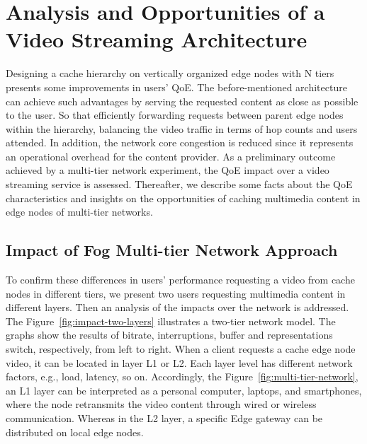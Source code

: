 \section{Analysis and Opportunities of a Video Streaming Architecture}
\label{sec:system-archi}


Designing a cache hierarchy on vertically organized edge nodes with N tiers presents some improvements in users’ QoE. The before-mentioned architecture can achieve such advantages by serving the requested content as close as possible to the user. So that efficiently forwarding requests between parent edge nodes within the hierarchy, balancing the video traffic in terms of hop counts and users attended. In addition, the network core congestion is reduced since it represents an operational overhead for the content provider.
As a preliminary outcome achieved by a multi-tier network experiment, the QoE impact over a video streaming service is assessed. Thereafter, we describe some facts about the QoE characteristics and insights on the opportunities of caching multimedia content in edge nodes of multi-tier networks.

\subsection{Impact of Fog Multi-tier Network Approach}

To confirm these differences in users' performance requesting a video from cache nodes in different tiers, we present two users requesting multimedia content in different layers. Then an analysis of the impacts over the network is addressed. The Figure~\ref{fig:impact-two-layers} illustrates a two-tier network model. The graphs show the results of bitrate, interruptions, buffer and representations switch, respectively, from left to right.%
When a client requests a cache edge node video, it can be located in layer L1 or L2. Each layer level has different network factors, e.g., load, latency, so on. Accordingly, the Figure~\ref{fig:multi-tier-network}, an L1 layer can be interpreted as a personal computer, laptops, and smartphones, where the node retransmits the video content through wired or wireless communication. Whereas in the L2 layer, a specific Edge gateway can be distributed on local edge nodes.

